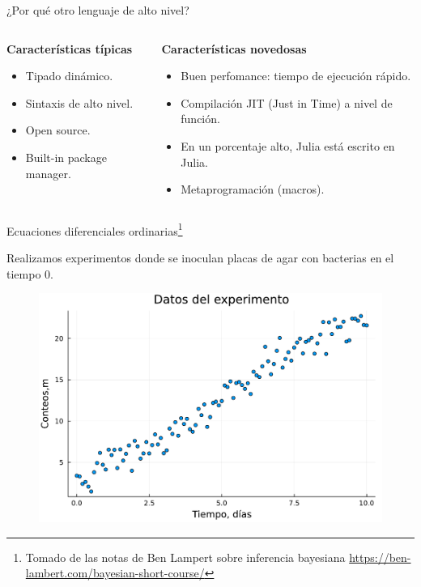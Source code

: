 \documentclass[11pt]{beamer}
\begin{document}
\begin{frame}{¿Por qué otro lenguaje de alto nivel?}


\begin{columns}
\begin{column}{0.5\textwidth}
	{\center \textbf{Características típicas}}
	
	\begin{itemize}
		\item Tipado dinámico. 
		\item Sintaxis de alto nivel.
		\item Open source.
		\item Built-in package manager.
	\end{itemize}
\end{column}
\begin{column}{0.5\textwidth}  %
	{\center \textbf{Características novedosas}}
	\begin{itemize}
		\item Buen perfomance: tiempo de ejecución rápido.
		\item Compilación JIT (Just in Time) a nivel de función.
		\item En un porcentaje alto, Julia está escrito en Julia. 
		\item Metaprogramación (macros).
	\end{itemize}
\end{column}
\end{columns}

\end{frame}



\begin{frame}{Ecuaciones diferenciales ordinarias\footnote{Tomado de las notas de Ben Lampert sobre inferencia bayesiana \url{https://ben-lambert.com/bayesian-short-course/}}}

Realizamos experimentos donde se inoculan placas de agar con bacterias en el tiempo 0.
	\begin{figure}
		\includegraphics[scale=0.4]{images/bacterias_experimento.pdf}

	\end{figure}
\end{frame}
\end{document}

